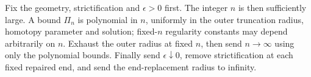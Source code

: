 \begin{remark}\label{four:rem:constants}
Fix the geometry, strictification and $\epsilon>0$ first. The integer
$n$ is then sufficiently large. A bound $\Pi_n$ is polynomial in $n$,
uniformly in the outer truncation radius, homotopy parameter and solution;
fixed-$n$ regularity constants may depend arbitrarily on $n$.
Exhaust the outer radius at fixed $n$, then send $n\to\infty$ using
only the polynomial bounds. Finally send $\epsilon\downarrow0$,
remove strictification at each fixed repaired end, and send the
end-replacement radius to infinity.
\end{remark}
